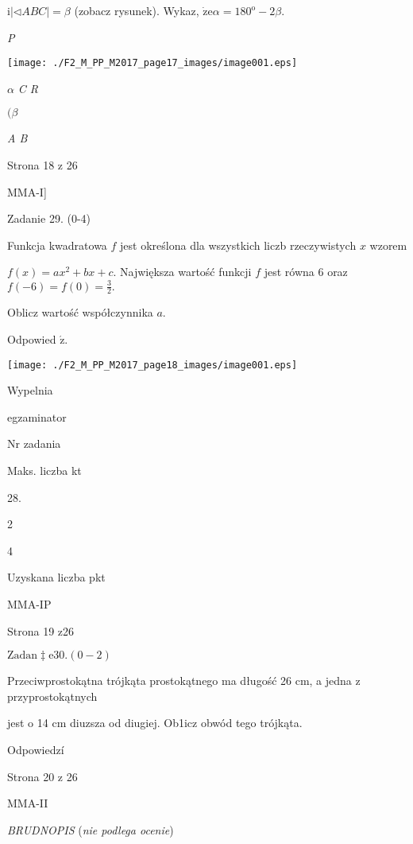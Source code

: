 \documentclass[a4paper,12pt]{article}
\begin{document}
$\mathrm{i}|\triangleleft ABC|=\beta$ (zobacz rysunek). Wykaz, $\dot{\mathrm{z}}\mathrm{e}\alpha=180^{\mathrm{o}}-2\beta.$

{\it P}
\begin{center}
\texttt{[image: ./F2\_M\_PP\_M2017\_page17\_images/image001.eps]}
\end{center}
$\alpha$  {\it C  R}

$(\beta$

{\it A  B}

Strona 18 z 26

MMA-I]





Zadanie 29. (0-4)

Funkcja kwadratowa $f$ jest określona dla wszystkich liczb rzeczywistych $x$ wzorem

$f(x)=ax^{2}+bx+c$. Największa wartość funkcji $f$ jest równa 6 oraz $f(-6)=f(0)=\displaystyle \frac{3}{2}.$

Oblicz wartość współczynnika $a.$

Odpowied $\acute{\mathrm{z}}.$
\begin{center}
\texttt{[image: ./F2\_M\_PP\_M2017\_page18\_images/image001.eps]}
\end{center}
Wypelnia

egzaminator

Nr zadania

Maks. liczba kt

28.

2

4

Uzyskana liczba pkt

MMA-IP

Strona 19 z26





$\mathrm{Z}\mathrm{a}\mathrm{d}\mathrm{a}\mathrm{n}\ddagger \mathrm{e}30. (0-2)$

Przeciwprostokątna trójkąta prostokątnego ma długość 26 cm, a jedna z przyprostokątnych

jest o 14 cm diuzsza od diugiej. Ob1icz obwód tego trójkąta.

Odpowiedzí

Strona 20 z 26

MMA-II





{\it BRUDNOPIS} ({\it nie podlega ocenie})
\end{document}
